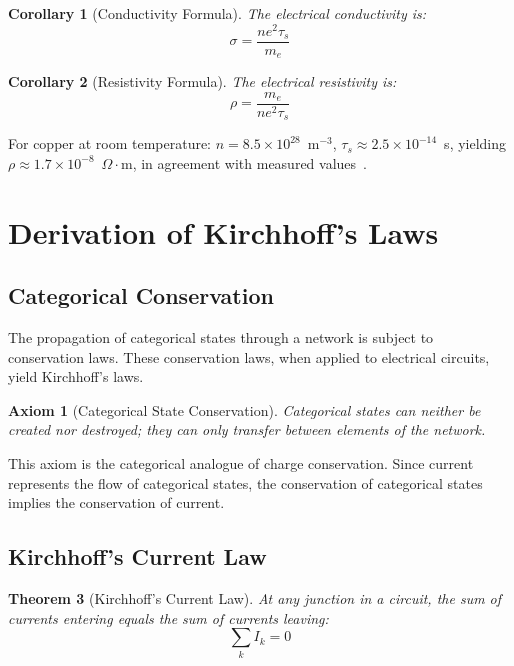 \documentclass[twocolumn,showpacs,preprintnumbers,amsmath,amssymb,prd]{revtex4-2}
\newtheorem{theorem}{Theorem}[section]
\newtheorem{corollary}[theorem]{Corollary}
\newtheorem{axiom}{Axiom}
\newcommand{\taus}{\tau_s}
\begin{document}
\begin{corollary}[Conductivity Formula]
\label{cor:conductivity}
The electrical conductivity is:
\begin{equation}
\sigma = \frac{ne^2\taus}{m_e}
\label{eq:conductivity}
\end{equation}
\end{corollary}

\begin{corollary}[Resistivity Formula]
\label{cor:resistivity}
The electrical resistivity is:
\begin{equation}
\rho = \frac{m_e}{ne^2\taus}
\label{eq:resistivity}
\end{equation}
\end{corollary}

For copper at room temperature: $n = 8.5 \times 10^{28}$~m$^{-3}$, $\taus \approx 2.5 \times 10^{-14}$~s, yielding $\rho \approx 1.7 \times 10^{-8}$~$\Omega\cdot$m, in agreement with measured values~\cite{Haynes2016}.


\section{Derivation of Kirchhoff's Laws}
\label{sec:kirchhoff}

\subsection{Categorical Conservation}

The propagation of categorical states through a network is subject to conservation laws. These conservation laws, when applied to electrical circuits, yield Kirchhoff's laws.

\begin{axiom}[Categorical State Conservation]
\label{ax:conservation}
Categorical states can neither be created nor destroyed; they can only transfer between elements of the network.
\end{axiom}

This axiom is the categorical analogue of charge conservation. Since current represents the flow of categorical states, the conservation of categorical states implies the conservation of current.

\subsection{Kirchhoff's Current Law}

\begin{theorem}[Kirchhoff's Current Law]
\label{thm:kcl}
At any junction in a circuit, the sum of currents entering equals the sum of currents leaving:
\begin{equation}
\sum_k I_k = 0
\label{eq:kcl}
\end{equation}
\end{theorem}
\end{document}
